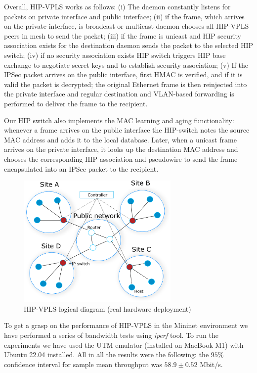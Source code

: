 Overall, HIP-VPLS works as follows: (i) The daemon constantly listens for packets on private interface 
and public interface; (ii) if the frame, which arrives on the private interface, is broadcast or multicast 
daemon chooses all HIP-VPLS peers in mesh to send the packet; 
(iii) if the frame is unicast and HIP security association exists for the destination daemon 
sends the packet to the selected HIP switch; (iv) if no security association exists HIP switch triggers 
HIP base exchange to negotiate secret keys and to establish security association; (v) If the 
IPSec packet arrives on the public interface, first HMAC is verified, and if it is valid the packet 
is decrypted; the original Ethernet frame is then reinjected into the private interface and 
regular destination and VLAN-based forwarding is performed to deliver the frame to the recipient. 

Our HIP switch also implements the MAC learning and aging functionality: whenever a frame arrives 
on the public interface the HIP-switch notes the source MAC address 
and adds it to the local database. Later, when a unicast frame arrives on the private interface, 
it looks up the destination MAC address and chooses the corresponding HIP association and pseudowire to send
the frame encapsulated into an IPSec packet to the recipient. 


\begin{figure}[h!]
    \centering
    \includegraphics[width=0.7\textwidth]{graphics/hw-hipls.png}
    \caption{HIP-VPLS logical diagram (real hardware deployment)}
    \label{fig:mininet}
\end{figure}

To get a grasp on the performance of HIP-VPLS in the Mininet environment we 
have performed a series of bandwidth tests using {\it iperf} tool. To run
the experiments we have used the UTM emulator (installed on MacBook M1) 
with Ubuntu 22.04 installed. All in all the results were the following: 
the $95\%$ confidence interval for sample mean throughput was 
$58.9 \pm 0.52$ Mbit/s.

